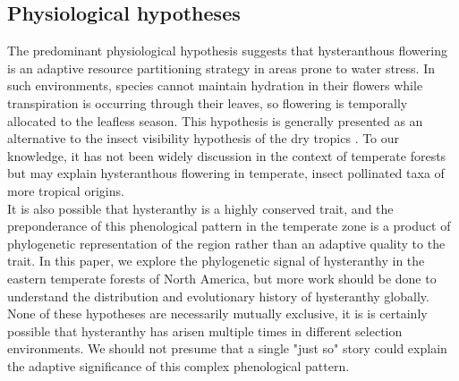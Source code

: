 \documentclass{article}\usepackage[]{graphicx}\usepackage[]{color}
\begin{document}
\subsection*{Physiological hypotheses}
\indent The predominant physiological hypothesis suggests that hysteranthous flowering is an adaptive resource partitioning strategy in areas prone to water stress. In such environments, species cannot maintain hydration in their flowers while transpiration is occurring through their leaves, so flowering is temporally allocated to the leafless season. This hypothesis is generally presented as an alternative to the insect visibility hypothesis of the dry tropics \citep{Franklin2016}. To our knowledge, it has not been widely discussion in the context of temperate forests but may explain hysteranthous flowering in temperate, insect pollinated taxa of more tropical origins.\\%
\indent It is also possible that hysteranthy is a highly conserved trait, and the preponderance of this phenological pattern in the temperate zone is a product of phylogenetic representation of the region rather than an adaptive quality to the trait. In this paper, we explore the phylogenetic signal of hysteranthy in the eastern temperate forests of North America, but more work should be done to understand the distribution and evolutionary history of hysteranthy globally.\\
\indent None of these hypotheses are necessarily mutually exclusive, it is is certainly possible that hysteranthy has arisen multiple times in different selection environments. We should not presume that a single "just so" story could explain the adaptive significance of this complex phenological pattern.\\
\end{document}
